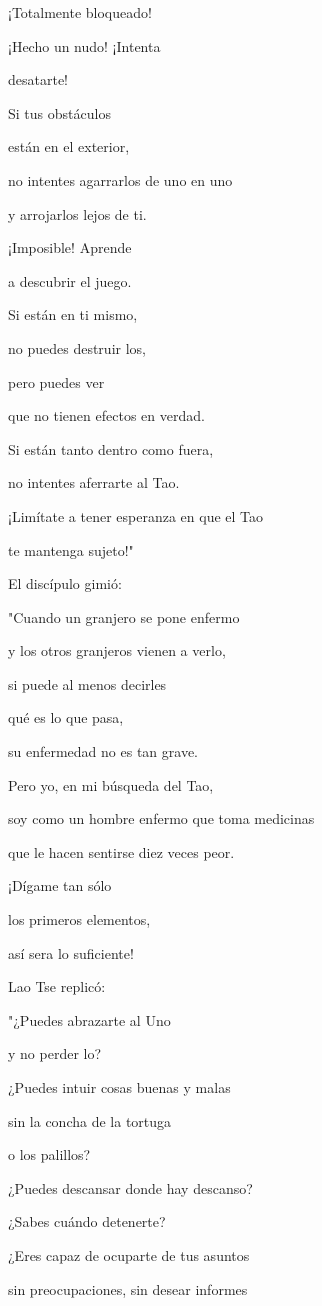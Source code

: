 ¡Totalmente bloqueado!

¡Hecho un nudo! ¡Intenta

desatarte!

Si tus obstáculos

están en el exterior,

no intentes agarrarlos de uno en uno

y arrojarlos lejos de ti.

¡Imposible! Aprende

a descubrir el juego.

Si están en ti mismo,

no puedes destruir los,

pero puedes ver

que no tienen efectos en verdad.

Si están tanto dentro como fuera,

no intentes aferrarte al Tao.

¡Limítate a tener esperanza en que el Tao

te mantenga sujeto!"

El discípulo gimió:

"Cuando un granjero se pone enfermo

y los otros granjeros vienen a verlo,

si puede al menos decirles

qué es lo que pasa,

su enfermedad no es tan grave.

Pero yo, en mi búsqueda del Tao,

soy como un hombre enfermo que toma medicinas

que le hacen sentirse diez veces peor.

¡Dígame tan sólo

los primeros elementos,

así sera lo suficiente!

Lao Tse replicó:

"¿Puedes abrazarte al Uno

y no perder lo?

¿Puedes intuir cosas buenas y malas

sin la concha de la tortuga

o los palillos?

¿Puedes descansar donde hay descanso?

¿Sabes cuándo detenerte?

¿Eres capaz de ocuparte de tus asuntos

sin preocupaciones, sin desear informes

